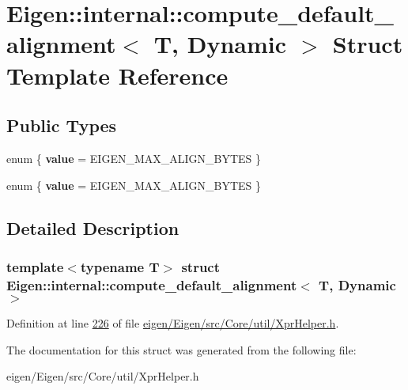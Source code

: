 \hypertarget{struct_eigen_1_1internal_1_1compute__default__alignment_3_01_t_00_01_dynamic_01_4}{}\section{Eigen\+:\+:internal\+:\+:compute\+\_\+default\+\_\+alignment$<$ T, Dynamic $>$ Struct Template Reference}
\label{struct_eigen_1_1internal_1_1compute__default__alignment_3_01_t_00_01_dynamic_01_4}
\subsection*{Public Types}
\begin{DoxyCompactItemize}
\item 
\mbox{\label{struct_eigen_1_1internal_1_1compute__default__alignment_3_01_t_00_01_dynamic_01_4_a5ffb12ab75db8e78f581617ee483d7bb}} 
enum \{ {\bfseries value} = E\+I\+G\+E\+N\+\_\+\+M\+A\+X\+\_\+\+A\+L\+I\+G\+N\+\_\+\+B\+Y\+T\+ES
 \}
\item 
\mbox{\label{struct_eigen_1_1internal_1_1compute__default__alignment_3_01_t_00_01_dynamic_01_4_a0926dce6bbdaa818b770cef399a78124}} 
enum \{ {\bfseries value} = E\+I\+G\+E\+N\+\_\+\+M\+A\+X\+\_\+\+A\+L\+I\+G\+N\+\_\+\+B\+Y\+T\+ES
 \}
\end{DoxyCompactItemize}


\subsection{Detailed Description}
\subsubsection*{template$<$typename T$>$\newline
struct Eigen\+::internal\+::compute\+\_\+default\+\_\+alignment$<$ T, Dynamic $>$}



Definition at line \hyperlink{eigen_2_eigen_2src_2_core_2util_2_xpr_helper_8h_source_l00226}{226} of file \hyperlink{eigen_2_eigen_2src_2_core_2util_2_xpr_helper_8h_source}{eigen/\+Eigen/src/\+Core/util/\+Xpr\+Helper.\+h}.



The documentation for this struct was generated from the following file\+:\begin{DoxyCompactItemize}
\item 
eigen/\+Eigen/src/\+Core/util/\+Xpr\+Helper.\+h\end{DoxyCompactItemize}
